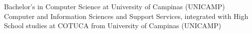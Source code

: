 %
%
%


\begin{scholarship}
					{Bachelor's in Computer Science at University of Campinas (UNICAMP)}
	\emptySeparator
					{Computer and Information Sciences and Support Services, integrated with High School
					studies at COTUCA from University of Campinas (UNICAMP)}

\end{scholarship}
